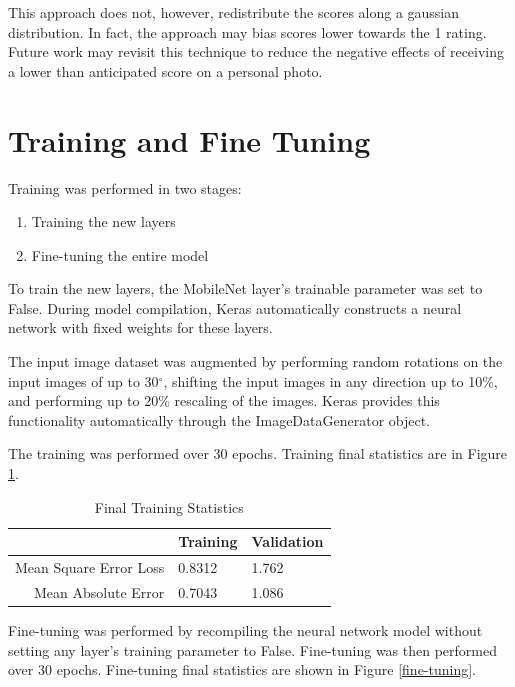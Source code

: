 \documentclass{article}
\begin{document}
This approach does not, however, redistribute the scores along a gaussian distribution.  In fact, the approach may bias scores lower towards the 1 rating.  Future work may revisit this technique to reduce the negative effects of receiving a lower than anticipated score on a personal photo.

\section{Training and Fine Tuning}

Training was performed in two stages:

\begin{enumerate}
    \item Training the new layers
    \item Fine-tuning the entire model
\end{enumerate}

To train the new layers, the MobileNet layer's trainable parameter was set to False.  During model compilation, Keras automatically constructs a neural network with fixed weights for these layers.

The input image dataset was augmented by performing random rotations on the input images of up to 30$^\circ$, shifting the input images in any direction up to 10\%, and performing up to 20\% rescaling of the images.  Keras provides this functionality automatically through the ImageDataGenerator object.

The training was performed over 30 epochs.  Training final statistics are in Figure \ref{training}.

\begin{table}[ht]
    \centering
    \begin{tabular}{|r|l|l|}
        \hline
        & Training & Validation \\ \hline
        Mean Square Error Loss & 0.8312 & 1.762 \\ \hline
        Mean Absolute Error & 0.7043 & 1.086 \\ \hline
    \end{tabular}
    \caption{Final Training Statistics}
    \label{training}
\end{table}

Fine-tuning was performed by recompiling the neural network model without setting any layer's training parameter to False.  Fine-tuning was then performed over 30 epochs.  Fine-tuning final statistics are shown in Figure \ref{fine-tuning}.
\end{document}
